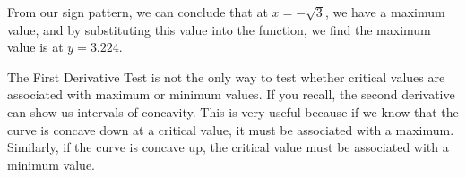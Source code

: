 \begin{tcolorbox}[solution]
\begin{center}
    \end{center}
    From our sign pattern, we can conclude that at $x = -\sqrt{3}$, we have a maximum value, and by substituting this value into the function, we find the maximum value is at $\boxed{y = 3.224}$.
\end{tcolorbox}

The First Derivative Test is not the only way to test whether critical values are associated with maximum or minimum values. If you recall, the second derivative can show us intervals of concavity. This is very useful because if we know that the curve is concave down at a critical value, it must be associated with a maximum. Similarly, if the curve is concave up, the critical value must be associated with a minimum value. \par

\begin{center}
\end{center}

